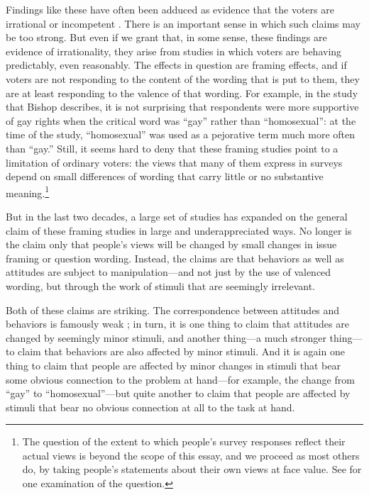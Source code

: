 \documentclass[11pt,letterpaper]{article}
\begin{document}
Findings like these have often been adduced as evidence that the voters are
irrational or incompetent \citep[e.g.,][]{bishop2004,caplan2011}. There is an
important sense in which such claims may be too strong. But even if we grant
that, in some sense, these findings are evidence of irrationality, they arise
from studies in which voters are behaving predictably, even reasonably. The
effects in question are framing effects, and if voters are not responding to the
content of the wording that is put to them, they are at least responding to the
valence of that wording. For example, in the study that Bishop describes, it is
not surprising that respondents were more supportive of gay rights when the
critical word was ``gay'' rather than ``homosexual'': at the time of the study,
``homosexual'' was used as a pejorative term much more often than ``gay.''
Still, it seems hard to deny that these framing studies point to a limitation of
ordinary voters: the views that many of them express in surveys depend on small
differences of wording that carry little or no substantive
meaning.\footnote{The question of the extent to which people's survey responses
reflect their actual views is beyond the scope of this essay, and we proceed as
most others do, by taking people's statements about their own views at face
value. See \citet{bullock2019} for one examination of the question.}

But in the last two decades, a large set of studies has expanded on the general
claim of these framing studies in large and underappreciated ways. No longer is
the claim only that people's views will be changed by small changes in issue
framing or question wording. Instead, the claims are that behaviors as well as
attitudes are subject to manipulation---and not just by the use of valenced
wording, but through the work of stimuli that are seemingly irrelevant.

Both of these claims are striking. The correspondence between attitudes and
behaviors is famously weak \citep{greenwald1968}; in turn, it is one thing to
claim that attitudes are changed by seemingly minor stimuli, and another
thing---a much stronger thing---to claim that behaviors are also affected by
minor stimuli. And it is again one thing to claim that people are affected by
minor changes in stimuli that bear some obvious connection to the problem at
hand---for example, the change from ``gay'' to ``homosexual''---but quite
another to claim that people are affected by stimuli that bear no obvious
connection at all to the task at hand.
\end{document}
